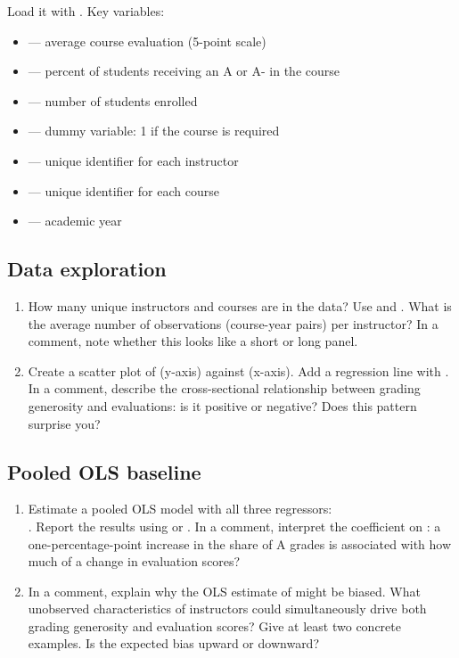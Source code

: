 Load it with . Key variables:
\begin{itemize}
  \item {} --- average course evaluation (5-point scale)
  \item {} --- percent of students receiving an A or A- in the course
  \item {} --- number of students enrolled
  \item {} --- dummy variable: 1 if the course is required
  \item {} --- unique identifier for each instructor
  \item {} --- unique identifier for each course
  \item {} --- academic year
\end{itemize}

\subsection{Data exploration}

\begin{enumerate}[label=\alph*)]
  \item How many unique instructors and courses are in the data? Use  and . What is the average number of observations (course-year pairs) per instructor? In a comment, note whether this looks like a short or long panel.
  \item Create a scatter plot of  (y-axis) against  (x-axis). Add a regression line with . In a comment, describe the cross-sectional relationship between grading generosity and evaluations: is it positive or negative? Does this pattern surprise you?
\end{enumerate}

\subsection{Pooled OLS baseline}

\begin{enumerate}[label=\alph*)]
  \item Estimate a pooled OLS model with all three regressors: \\. Report the results using  or . In a comment, interpret the coefficient on : a one-percentage-point increase in the share of A grades is associated with how much of a change in evaluation scores?
  \item In a comment, explain why the OLS estimate of  might be biased. What unobserved characteristics of instructors could simultaneously drive both grading generosity and evaluation scores? Give at least two concrete examples. Is the expected bias upward or downward?
\end{enumerate}

